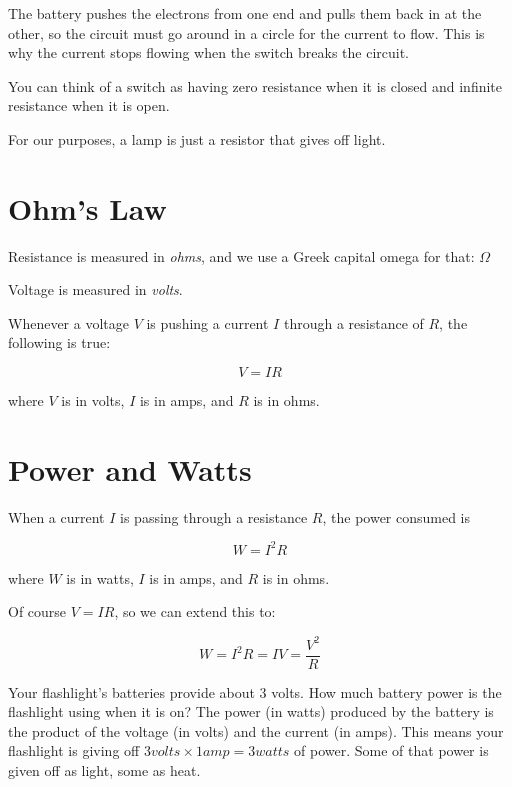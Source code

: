 The battery pushes the electrons from one end and pulls them back in at the other, so the circuit must go around in a circle for the current to flow. This is why the current stops flowing when the switch breaks the circuit.

You can think of a switch as having zero resistance when it is closed and infinite resistance when it is open.


For our purposes, a lamp is just a resistor that gives off light.

\section{Ohm's Law}

Resistance is measured in \textit{ohms}, and we use a Greek capital omega for that: $\Omega$  

Voltage is measured in
\textit{volts}.

\begin{mdframed}[style=important, frametitle={Ohm's Law}]
  Whenever a voltage $V$ is pushing a current $I$ through a resistance of $R$, the following is true:

  $$V = IR$$

  where $V$ is in volts, $I$ is in amps, and $R$ is in ohms.
\end{mdframed}

\section{Power and Watts}

\begin{mdframed}[style=important, frametitle={Joule's Law}]

  When a current $I$ is passing through a resistance $R$, the power consumed is
  
  $$W = I^2 R$$

  where $W$ is in watts, $I$ is in amps, and $R$ is in ohms.
\end{mdframed}

Of course $V = IR$, so we can extend this to:

$$W = I^2 R = I V = \frac{V^2}{R}$$

Your flashlight's batteries provide about 3 volts. How much
battery power is the flashlight using when it is on? The power (in
watts) produced by the battery is the product of the voltage (in
volts) and the current (in amps). This means your flashlight is giving off $3
volts \times 1 amp = 3 watts$ of power. Some of that power is given
off as light, some as heat.

